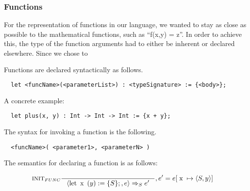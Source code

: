 \subsubsection{Functions}
\label{subsec:functions}

For the representation of functions in our language, we wanted to stay as close as possible to the mathematical functions, such as \enquote{f(x,y) = z}. In order to achieve this, the type of the function arguments had to either be inherent or declared elsewhere. Since we chose to 


Functions are declared syntactically as follows.

\begin{verbatim}
  let <funcName>(<parameterList>) : <typeSignature> := {<body>};
\end{verbatim}

A concrete example:

\begin{verbatim}
  let plus(x, y) : Int -> Int -> Int := {x + y};
\end{verbatim}

The syntax for invoking a function is the following.

\begin{verbatim}
  <funcName>( <parameter1>, <parameterN> )
\end{verbatim}

The semantics for declaring a function is as follows:

\begin{align*}
&\inference[$\text{INIT}_{FUNC}$]{}
                         {\Braket{\Tlet \Tx(y) := \{S\};,e} \Rightarrow_S e'}
												 {, e' = e[\Tx \mapsto \Braket{S,y}]}
\end{align*}